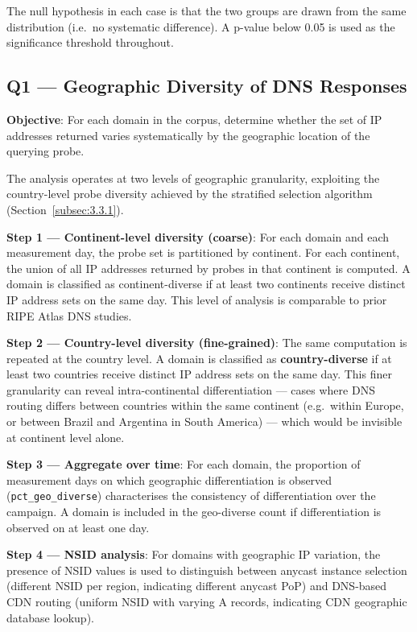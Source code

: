 The null hypothesis in each case is that the two groups are drawn from the same distribution (i.e.\ no systematic difference). A p-value below 0.05 is used as the significance threshold throughout.

\subsection{Q1 --- Geographic Diversity of DNS Responses}
\label{subsec:3.5.1}

\textbf{Objective}: For each domain in the corpus, determine whether the set of \ac{IP} addresses returned varies systematically by the geographic location of the querying probe.

The analysis operates at two levels of geographic granularity, exploiting the country-level probe diversity achieved by the stratified selection algorithm (Section~\ref{subsec:3.3.1}).

\textbf{Step 1 --- Continent-level diversity (coarse)}: For each domain and each measurement day, the probe set is partitioned by continent. For each continent, the union of all \ac{IP} addresses returned by probes in that continent is computed. A domain is classified as continent-diverse if at least two continents receive distinct \ac{IP} address sets on the same day. This level of analysis is comparable to prior RIPE Atlas \ac{DNS} studies.

\textbf{Step 2 --- Country-level diversity (fine-grained)}: The same computation is repeated at the country level. A domain is classified as \textbf{country-diverse} if at least two countries receive distinct \ac{IP} address sets on the same day. This finer granularity can reveal intra-continental differentiation --- cases where \ac{DNS} routing differs between countries within the same continent (e.g.\ within Europe, or between Brazil and Argentina in South America) --- which would be invisible at continent level alone.

\textbf{Step 3 --- Aggregate over time}: For each domain, the proportion of measurement days on which geographic differentiation is observed (\texttt{pct\_geo\_diverse}) characterises the consistency of differentiation over the campaign. A domain is included in the geo-diverse count if differentiation is observed on at least one day.

\textbf{Step 4 --- \ac{NSID} analysis}: For domains with geographic \ac{IP} variation, the presence of \ac{NSID} values is used to distinguish between anycast instance selection (different \ac{NSID} per region, indicating different anycast \ac{PoP}) and \ac{DNS}-based \ac{CDN} routing (uniform \ac{NSID} with varying \ac{A} records, indicating \ac{CDN} geographic database lookup).

